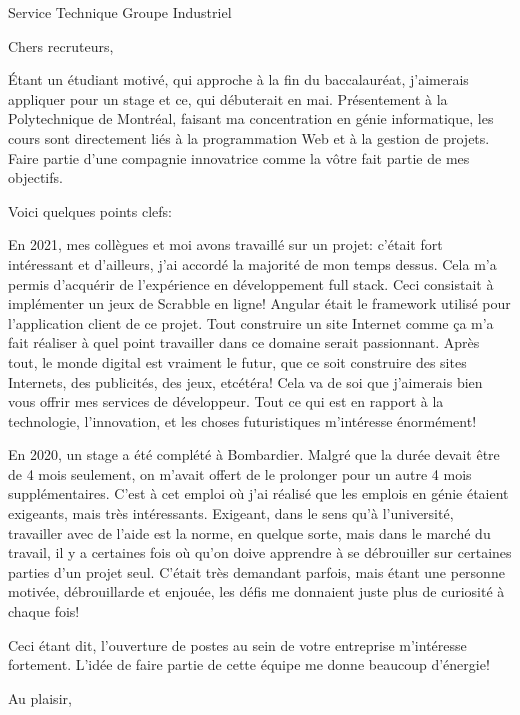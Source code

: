 \documentclass[12pt,french]{letter}
\begin{document}
\pagestyle{headings}

\begin{letter}{Service Technique Groupe Industriel}
\address{Montréal, Canada}

\opening{Chers recruteurs,}


Étant un étudiant motivé, qui approche à la fin du baccalauréat, j’aimerais appliquer pour un stage et ce, qui débuterait en mai.  Présentement à la Polytechnique de Montréal, faisant ma concentration en génie informatique, les cours sont directement liés à la programmation Web et à la gestion de projets.  Faire partie d’une compagnie innovatrice comme la vôtre fait partie de mes objectifs.

Voici quelques points clefs:

En 2021, mes collègues et moi avons travaillé sur un projet: c’était fort intéressant et d’ailleurs, j’ai accordé la majorité de mon temps dessus.  Cela m'a permis d’acquérir de l’expérience en développement full stack.  Ceci consistait à implémenter un jeux de Scrabble en ligne! Angular était le framework utilisé pour l'application client de ce projet.  Tout construire un site Internet comme ça m’a fait réaliser à quel point travailler dans ce domaine serait passionnant.  Après tout, le monde digital est vraiment le futur, que ce soit construire des sites Internets, des publicités, des jeux, etcétéra!  Cela va de soi que j’aimerais bien vous offrir mes services de développeur.  Tout ce qui est en rapport à la technologie, l’innovation, et les choses futuristiques m’intéresse énormément! 

En 2020, un stage a été complété à Bombardier.  Malgré que la durée devait être de 4 mois seulement, on m’avait offert de le prolonger pour un autre 4 mois supplémentaires.  C’est à cet emploi où j’ai réalisé que les emplois en génie étaient exigeants, mais très intéressants. Exigeant, dans le sens qu’à l’université, travailler avec de l'aide est la norme, en quelque sorte, mais dans le marché du travail, il y a certaines fois où qu’on doive apprendre à se débrouiller sur certaines parties d’un projet seul.  C’était très demandant parfois, mais étant une personne motivée, débrouillarde et enjouée, les défis me donnaient juste plus de curiosité à chaque fois!

Ceci étant dit, l'ouverture de postes au sein de votre entreprise m’intéresse fortement.
L’idée de faire partie de cette équipe me donne beaucoup d’énergie!


\signature{Maxime Laroche}

\closing{Au plaisir,}


\end{letter}
\end{document}
